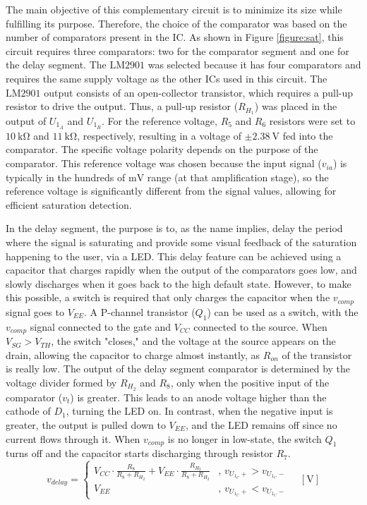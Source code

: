 \noindent
The main objective of this complementary circuit is to minimize its size while fulfilling its purpose. Therefore, the choice of the comparator was based on the number of comparators present in the \ac{IC}. As shown in Figure \ref{figure:sat}, this circuit requires three comparators: two for the comparator segment and one for the delay segment. The $\mathrm{LM2901}$ was selected because it has four comparators and requires the same supply voltage as the other \ac{IC}s used in this circuit. The $\mathrm{LM2901}$ output consists of an open-collector transistor, which requires a pull-up resistor to drive the output. Thus, a pull-up resistor ($R_{H_1}$) was placed in the output of $U_{1_A}$ and $U_{1_B}$. For the reference voltage, $R_5$ and $R_6$ resistors were set to $\mathrm{10~k\Omega}$ and $\mathrm{11~k\Omega}$, respectively, resulting in a voltage of $\mathrm{\pm2.38~V}$ fed into the comparator. The specific voltage polarity depends on the purpose of the comparator. This reference voltage was chosen because the input signal ($v_{ia}$) is typically in the hundreds of $\mathrm{mV}$ range (at that amplification stage), so the reference voltage is significantly different from the signal values, allowing for efficient saturation detection.

In the delay segment, the purpose is to, as the name implies, delay the period where the signal is saturating and provide some visual feedback of the saturation happening to the user, via a \ac{LED}. This delay feature can be achieved using a capacitor that charges rapidly when the output of the comparators goes low, and slowly discharges when it goes back to the high default state. However, to make this possible, a switch is required that only charges the capacitor when the $v_{comp}$ signal goes to $V_{EE}$. A P-channel transistor ($Q_1$) can be used as a switch, with the $v_{comp}$ signal connected to the gate and $V_{CC}$ connected to the source. When $V_{SG} > V_{TH}$, the switch "closes," and the voltage at the source appears on the drain, allowing the capacitor to charge almost instantly, as $R_{on}$ of the transistor is really low. The output of the delay segment comparator is determined by the voltage divider formed by $R_{H_2}$ and $R_8$, only when the positive input of the comparator ($v_t$) is greater. This leads to an anode voltage higher than the cathode of $D_1$, turning the \ac{LED} on. In contrast, when the negative input is greater, the output is pulled down to $V_{EE}$, and the \ac{LED} remains off since no current flows through it. When $v_{comp}$ is no longer in low-state, the switch $Q_1$ turns off and the capacitor starts discharging through resistor $R_7$.
\begin{equation}
    v_{delay} =
    \begin{cases}
        V_{CC} \cdot \frac{R_{8}}{R_{8}+R_{H_2}} + V_{EE} \cdot \frac{R_{H_2}}{R_{8}+R_{H_2}}&, \, v_{U_{1_C}+} > v_{U_{1_C}-} \\
        V_{EE}&, \, v_{U_{1_C}+} < v_{U_{1_C}-}
    \end{cases}
    \quad [\mathrm{V}]
    \label{equation:sat-delay}
\end{equation}

